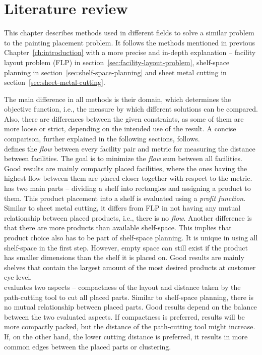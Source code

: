 \chapter{Literature review}\label{ch:literature-review}

This chapter describes methods used in different fields to solve a similar problem to the painting placement problem.
It follows the methods mentioned in previous Chapter~\ref{ch:introduction} with
a more precise and in-depth explanation – facility layout problem (FLP) in section~\ref{sec:facility-layout-problem},
shelf-space planning in section~\ref{sec:shelf-space-planning} and sheet metal cutting in section~\ref{sec:sheet-metal-cutting}.

The main difference in all methods is their domain, which determines the objective function, i.e.,
the measure by which different solutions can be compared.
Also, there are differences between the given constraints, as some of them are more loose or strict,
depending on the intended use of the result.
A concise comparison, further explained in the following sections, follows.\\

 defines the \textit{flow} between every facility pair and metric for measuring the distance between facilities.
The goal is to minimize the \textit{flow} sum between all facilities.
Good results are mainly compactly placed facilities, where the ones having the
highest flow between them are placed closer together with respect to the metric.\\

 has two main parts – dividing a shelf into rectangles and assigning a product to them.
This product placement into a shelf is evaluated using a \textit{profit function}. Similar to sheet metal cutting, it differs from FLP
in not having any mutual relationship between placed products, i.e., there is no \textit{flow}.
Another difference is that there are more products than available shelf-space.
This implies that product choice also has to be part of shelf-space planning.
It is unique in using all shelf-space in the first step.
However, empty space can still exist if the product has smaller dimensions than the shelf it is placed on.
Good results are mainly shelves that contain the largest amount of the most desired products at customer eye level.\\

 evaluates two aspects – compactness of the layout and distance taken by the path-cutting tool to cut all placed parts.
Similar to shelf-space planning, there is no mutual relationship between placed parts.
Good results depend on the balance between the two evaluated aspects. If compactness is
preferred, results will be more compactly packed, but the distance of the path-cutting tool might increase.
If, on the other hand, the lower cutting distance is preferred, it results in more common edges between the placed parts or clustering.\\







